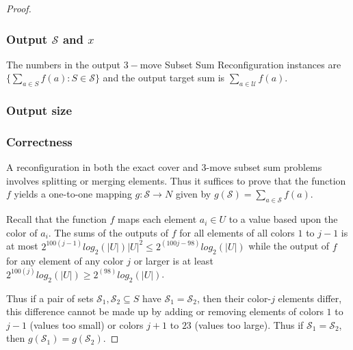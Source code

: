 \begin{proof}
\subsubsection{Output $\mathcal{S}$ and $x$}
The numbers in the output $3-$move Subset Sum Reconfiguration instances are $\{\sum_{a \in S} f(a) : S \in \mathcal{S}\}$ and the
output target sum is $\sum_{a \in \mathcal{U}} f(a)$.

\subsubsection{Output size}



\subsubsection{Correctness}
A reconﬁguration in both the exact cover and $3$-move subset sum problems involves splitting
or merging elements. Thus it suffices to prove that the function $f$ yields a one-to-one mapping $g : \mathcal{S} \rightarrow N$
given by $g(\mathcal{S}) = \sum_{a \in \mathcal{S}}^{} f(a)$.

Recall that the function $f$ maps each element $a_i \in U$ to a value based upon the color of $a_i$. The sums of
the outputs of $f$ for all elements of all colors $1$ to $j-1$ is at most $2^{100(j-1)} log_{2}(|U|)|U|^{2} \leq 2^{(100j-98)}log_{2}(|U|)$
while the output of $f$ for any element of any color $j$ or larger is at least $2^{100(j)} log_{2}(|U|) \geq 2^{(98)}log_{2}(|U|)$.

Thus if a pair of sets $\mathcal{S}_1, \mathcal{S}_2 \subseteq S$ have $\mathcal{S}_1 = \mathcal{S}_2$, then their color-$j$ elements
differ, this difference cannot be made up by adding or removing elements of colors $1$ to $j-1$ (values too small) or colors $j + 1$ to $23$
(values too large). Thus if $\mathcal{S}_1 = \mathcal{S}_2$, then $g(\mathcal{S}_1) = g(\mathcal{S}_2)$.



\end{proof}




